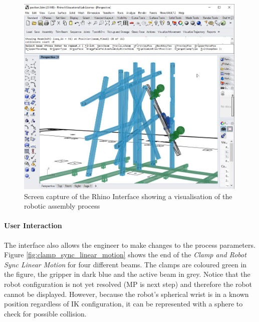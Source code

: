 \begin{figure}[!h]
    \centering
    \includegraphics[width=0.99\textwidth]{images/6a/img41.jpg}
    \caption{Screen capture of the Rhino Interface showing a visualisation of the robotic assembly process}
    \label{fig:rhino-interface-for-visualisation}
\end{figure}

\paragraph{User Interaction}

The interface also allows the engineer to make changes to the process parameters. Figure \ref{fig:clamp_sync_linear_motion} shows the end of the \textit{Clamp and Robot Sync Linear Motion} for four different beams. The clamps are coloured green in the figure, the gripper in dark blue and the active beam in grey. Notice that the robot configuration is not yet resolved (MP is next step) and therefore the robot cannot be displayed. However, because the robot’s spherical wrist is in a known position regardless of IK configuration, it can be represented with a sphere to check for possible collision.

